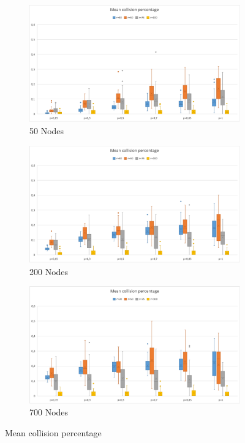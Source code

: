 \begin{figure}
\begin{subfigure}{0.35\hsize}\centering
    \includegraphics[width=1\hsize]{./images/Collision50Boxplot.png}
\caption{50 Nodes}
    \label{fig:sub1}
\end{subfigure}%
\begin{subfigure}{0.35\hsize}\centering
    \includegraphics[width=1\hsize]{./images/Collision200BoxplotScaled.png}
\caption{200 Nodes}
    \label{fig:sub2}
\end{subfigure}
\begin{subfigure}{0.35\hsize}\centering
    \includegraphics[width=1\hsize]{./images/Collision700Boxplot.png}
\caption{700 Nodes}
    \label{fig:sub2}
\end{subfigure}
\caption{Mean collision percentage}
\end{figure}
